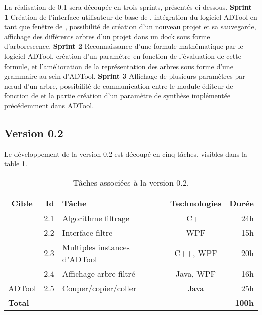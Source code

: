 		
		La réalisation de \glasir{} 0.1 sera découpée en trois sprints, présentés ci-dessous.\newline
		\textbf{Sprint 1} Création de l'interface utilisateur de base de \glasir{}, intégration du logiciel ADTool en tant que fenêtre de \glasir{}, possibilité de création d'un nouveau projet et sa sauvegarde, affichage des différents arbres d'un projet dans un dock sous forme d'arborescence.\newline
		\textbf{Sprint 2} Reconnaissance d'une formule mathématique par le logiciel ADTool, création d'un paramètre en fonction de l'évaluation de cette formule, et l'amélioration de la représentation des arbres sous forme d'une grammaire au sein d'ADTool.\newline
		\textbf{Sprint 3} Affichage de plusieurs paramètres par nœud d'un arbre, possibilité de communication entre le module éditeur de fonction de \glasir{} et la partie création d'un paramètre de synthèse implémentée précédemment dans ADTool.\newline


	\subsection{Version 0.2}
		Le développement de la version 0.2 est découpé en cinq tâches, visibles dans la {\sc table} \ref{tab:taches_units_2}.
		\begin{table}[h]
			\centering
			\begin{tabular}{|c|r|l|c|r|}
				\hline
				\textbf{Cible} & \textbf{Id} & \textbf{Tâche} & \textbf{Technologies} & \textbf{Durée}\\
				\hline

				\multirow{4}{*}{\glasir{}} & 2.1 & Algorithme filtrage & C++ & 24h\\
				\cline{2-5}
				 & 2.2 & Interface filtre & WPF & 15h\\
				\cline{2-5}
				 & 2.3 & Multiples instances d'ADTool & C++, WPF & 20h\\
				\cline{2-5}
				 & 2.4 & Affichage arbre filtré & Java, WPF & 16h\\
				\hline

				\multirow{1}{*}{ADTool} & 2.5 & Couper/copier/coller & \multirow{1}{*}{Java} & 25h\\
				\hline

				\multicolumn{4}{|l|}{\bf Total} & {\bf 100h}\\
				\hline
			\end{tabular}
			\caption{Tâches associées à la version 0.2.}
			\label{tab:taches_units_2}
		\end{table}
		
